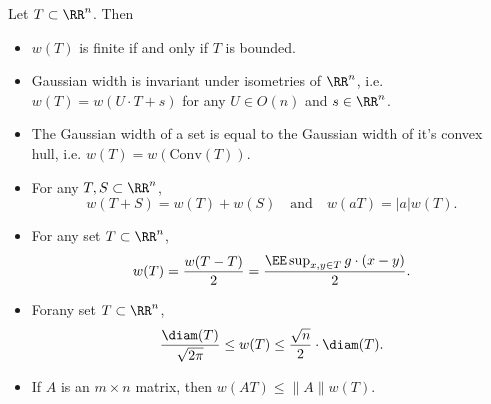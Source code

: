 \begin{theorem}
	Let $T \subset \RR^n$. Then
	\begin{itemize}
		\item $w(T)$ is finite if and only if $T$ is bounded.
		\item Gaussian width is invariant under isometries of $\RR^n$, i.e. $w(T) = w(U \cdot T + s)$ for any $U \in O(n)$ and $s \in \RR^n$.
		\item The Gaussian width of a set is equal to the Gaussian width of it's convex hull, i.e. $w(T) = w(\text{Conv}(T))$.

		\item For any $T,S \subset \RR^n$,
		\[ w(T + S) = w(T) + w(S)\quad\text{and}\quad w(aT) = |a| w(T). \]

		\item For any set $T \subset \RR^n$,
		\[ w(T) = \frac{w(T-T)}{2} = \frac{\EE \sup_{x,y \in T} g \cdot (x-y)}{2}. \]

		\item Forany set $T \subset \RR^n$,
		\[ \frac{\diam(T)}{\sqrt{2\pi}} \leq w(T) \leq \frac{\sqrt{n}}{2} \cdot \diam(T). \]

		\item If $A$ is an $m \times n$ matrix, then $w(AT) \leq \| A \| w(T)$.
	\end{itemize}
\end{theorem}
